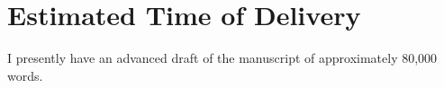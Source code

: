 \documentclass[12pt]{article}
\begin{document}

\section{Estimated Time of Delivery} %
\label{sec:estimated_time_of_delivery}

I presently have an advanced draft of the manuscript of approximately 80,000 words.




\end{document}

